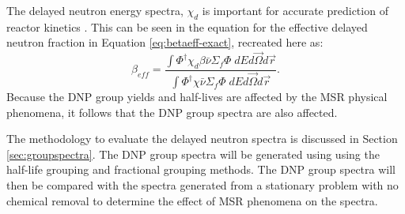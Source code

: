 The delayed neutron energy spectra, $\chi_d$ is important for accurate prediction of reactor kinetics \cite{das1993importance}.
This can be seen in the equation for the effective delayed neutron fraction in Equation \eqref{eq:betaeff-exact}, recreated here as:
\begin{equation}
    \beta_{eff} = \frac{\int \Phi^\dagger \chi_d \beta \bar{\nu} \Sigma_f \Phi \; dE d\vec{\Omega} d\vec{r}}{\int \Phi^\dagger \chi \bar{\nu} \Sigma_f \Phi \; dE d\vec{\Omega} d\vec{r}}.
    \nonumber
\end{equation}
Because the \gls{DNP} group yields and half-lives are affected by the \gls{MSR} physical phenomena, it follows that the \gls{DNP} group spectra are also affected.

The methodology to evaluate the delayed neutron spectra is discussed in Section \ref{sec:groupspectra}.
The \gls{DNP} group spectra will be generated using using the half-life grouping and fractional grouping methods.
The \gls{DNP} group spectra will then be compared with the spectra generated from a stationary problem with no chemical removal to determine the effect of \gls{MSR} phenomena on the spectra.
